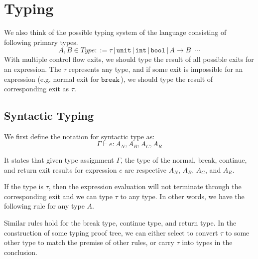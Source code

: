 \documentclass{article}
\numberwithin{algorithm}{section}
\newcommand{\cbreak}{\texttt{break}\,}
\newcommand{\tunit}{\texttt{unit}}
\newcommand{\tint}{\texttt{int}}
\newcommand{\tbool}{\texttt{bool}}
\newcommand{\sep}{\,|\,}
\begin{document}

\section{Typing}

We also think of the possible typing system of the language consisting of following primary types.
$$
A, B \in \textit{Type} ::= \tau \sep \tunit \sep \tint \sep \tbool \sep A \rightarrow B \sep \cdots
$$
With multiple control flow exits, we should type the result of all possible exits for an expression.
The $\tau$ represents any type, and if some exit is impossible for an expression (e.g. normal exit for $\cbreak\!$), we should type the result of corresponding exit as $\tau$.

\subsection{Syntactic Typing}

We first define the notation for syntactic type as:
$$
    \Gamma \vdash e: A_N, A_B, A_C, A_R
$$

It states that given type assignment $\Gamma$, the type of the normal, break, continue, and return exit results for expression $e$ are respective $A_N$, $A_B$, $A_C$, and $A_R$.

If the type is $\tau$, then the expression evaluation will not terminate through the corresponding exit and we can type $\tau$ to any type.
In other words, we have the following rule for any type $A$.
\begin{mathpar}
\end{mathpar}
Similar rules hold for the break type, continue type, and return type.
In the construction of some typing proof tree, we can either select to convert $\tau$ to some other type to match the premise of other rules, or carry $\tau$ into types in the conclusion.
\end{document}
